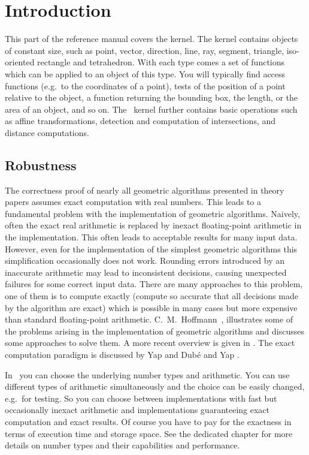 \section{Introduction}


{This} part of the reference manual covers the kernel.
The kernel contains objects of constant size, such as point, vector, 
direction, line, ray, segment, triangle, iso-oriented rectangle and 
tetrahedron. 
With each type comes a set of functions which can be applied to an object 
of this type.  
You will typically find access functions (e.g.\ to the coordinates of a point), 
tests of the position of a point relative to the object, a function returning 
the bounding box, the length, or the area of an object, and so on.
The \cgal\ kernel further contains basic operations such as affine
transformations, detection and computation of intersections, and distance 
computations.

\subsection{Robustness}
The correctness proof of nearly all geometric algorithms presented
in theory papers assumes exact computation with real numbers.
This leads to a fundamental problem with the implementation of geometric
algorithms.
Naively, often the exact real arithmetic is replaced by inexact floating-point 
arithmetic in the implementation.
This often leads to acceptable results for many input data.
However, even for the implementation of the simplest geometric 
algorithms this simplification occasionally does not work.
Rounding errors introduced by an inaccurate arithmetic may lead to 
inconsistent decisions, causing unexpected failures for some correct 
input data.
There are many approaches to this problem, one of them is to compute
exactly (compute so accurate that all decisions made by the algorithm
are exact) which is possible in many cases but more expensive
than standard floating-point arithmetic.
C.~M.~Hoffmann~\cite{h-gsm-89}, \cite{h-pargc-89} illustrates some 
of the problems arising in the implementation of geometric algorithms
and discusses some approaches to solve them. 
A more recent overview is given in \cite{s-rpigc-00}.
The exact computation paradigm is discussed by Yap and Dub\'e 
\cite{yd-ecp-95} and Yap \cite{y-tegc-97}.

In \cgal\ you can choose the underlying number types and arithmetic.  
You can use different types of arithmetic simultaneously and the choice can 
be easily changed, e.g.\ for testing.  
So you can choose between implementations with fast but occasionally inexact 
arithmetic and implementations guaranteeing exact computation and exact 
results.  
Of course you have to pay for the exactness in terms of execution time 
and storage space.  
See the dedicated chapter
for more details on number types and their capabilities and performance.
